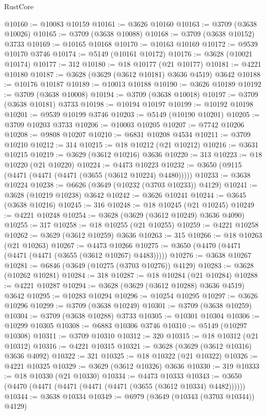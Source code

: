 \begin{lexlean}{RustCore}
\begin{coremodule}
@10160 := @10083 @10159
@10161 := @3626 @10160
@10163 := @3709 (@3638 @10026)
@10165 := @3709 (@3638 @10088)
@10168 := @3709 (@3638 @10152) @3733
@10169 := @10165 @10168
@10170 := @10163 @10169
@10172 := @9539 @10170 @3746
@10174 := @5149 (@10161 @10172)
@10176 := @3628 (@10021 @10174)
@10177 := 312
@10180 := @18 @10177 (@21 @10177)
@10181 := @4221 @10180
@10187 := @3628 (@3629 (@3612 @10181) @3636 @4519) @3642
@10188 := @10176 @10187
@10189 := @10013 @10188
@10190 := @3626 @10189
@10192 := @3709 (@3638 @10008)
@10194 := @3709 (@3638 @10018)
@10197 := @3709 (@3638 @10181) @3733
@10198 := @10194 @10197
@10199 := @10192 @10198
@10201 := @9539 @10199 @3746
@10203 := @5149 (@10190 @10201)
@10205 := @3709 @10203 @3733
@10206 := @10003 @10205
@10207 := @7742 @10206
@10208 := @9808 @10207
@10210 := @6831 @10208 @4534
@10211 := @3709 @10210
@10212 := 314
@10215 := @18 @10212 (@21 @10212)
@10216 := @3631 @10215
@10219 := @3629 (@3612 @10216) @3636
@10220 := 313
@10223 := @18 @10220 (@21 @10220)
@10224 := @4473 @10223
@10232 := @3650 (@9115 (@4471 (@4471 (@4471 (@3655 (@3612 @10224) @4480)))))
@10233 := @3638 @10224
@10238 := @6626 (@3649 (@10232 (@3703 @10233)) @4129)
@10241 := @3628 (@10219 @10238) @3642
@10242 := @3626 @10241
@10244 := @3645 (@3638 @10216)
@10245 := 316
@10248 := @18 @10245 (@21 @10245)
@10249 := @4221 @10248
@10254 := @3628 (@3629 (@3612 @10249) @3636 @4090)
@10255 := 317
@10258 := @18 @10255 (@21 @10255)
@10259 := @4221 @10258
@10262 := @3629 (@3612 @10259) @3636
@10263 := 315
@10266 := @18 @10263 (@21 @10263)
@10267 := @4473 @10266
@10275 := @3650 (@4470 (@4471 (@4471 (@4471 (@3655 (@3612 @10267) @4483)))))
@10276 := @3638 @10267
@10281 := @6846 (@3649 (@10275 (@3703 @10276)) @4129)
@10283 := @3628 (@10262 @10281)
@10284 := 318
@10287 := @18 @10284 (@21 @10284)
@10288 := @4221 @10287
@10294 := @3628 (@3629 (@3612 @10288) @3636 @4519) @3642
@10295 := @10283 @10294
@10296 := @10254 @10295
@10297 := @3626 @10296
@10299 := @3709 (@3638 @10249)
@10301 := @3709 (@3638 @10259)
@10304 := @3709 (@3638 @10288) @3733
@10305 := @10301 @10304
@10306 := @10299 @10305
@10308 := @6883 @10306 @3746
@10310 := @5149 (@10297 @10308)
@10311 := @3709 @10310
@10312 := 320
@10315 := @18 @10312 (@21 @10312)
@10316 := @4221 @10315
@10321 := @3628 (@3629 (@3612 @10316) @3636 @4092)
@10322 := 321
@10325 := @18 @10322 (@21 @10322)
@10326 := @4221 @10325
@10329 := @3629 (@3612 @10326) @3636
@10330 := 319
@10333 := @18 @10330 (@21 @10330)
@10334 := @4473 @10333
@10343 := @3650 (@4470 (@4471 (@4471 (@4471 (@4471 (@3655 (@3612 @10334) @4482))))))
@10344 := @3638 @10334
@10349 := @6979 (@3649 (@10343 (@3703 @10344)) @4129)

\end{coremodule}
\end{lexlean}
